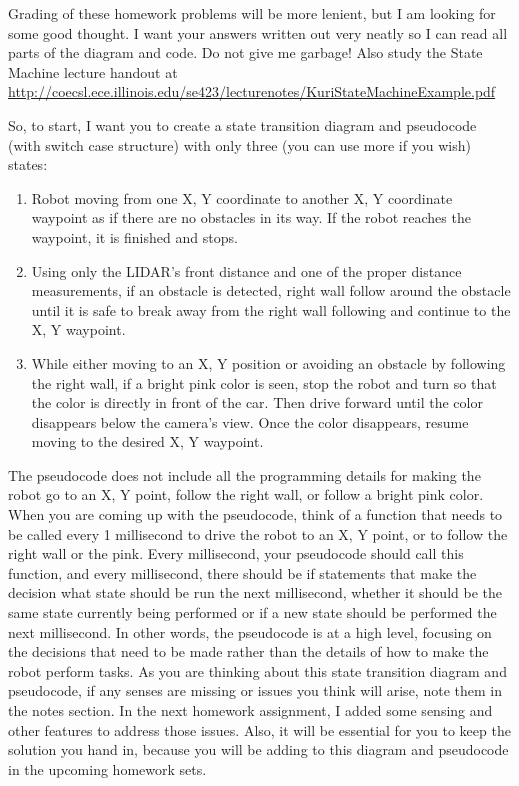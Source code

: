 \documentclass[11pt]{article}
\begin{document}
Grading of these homework problems will be more lenient, but I am looking for some good thought. I want your answers written out very neatly so I can read all parts of the diagram and code. Do not give me garbage! Also study the State Machine lecture handout at \url{http://coecsl.ece.illinois.edu/se423/lecturenotes/KuriStateMachineExample.pdf}

So, to start, I want you to create a state transition diagram and pseudocode (with switch case structure) with only three (you can use more if you wish) states:
\begin{enumerate}
    \item Robot moving from one X, Y coordinate to another X, Y coordinate waypoint as if there are no obstacles in its way. If the robot reaches the waypoint, it is finished and stops.
    \item Using only the LIDAR’s front distance and one of the proper distance measurements, if an obstacle is detected, right wall follow around the obstacle until it is safe to break away from the right wall following and continue to the X, Y waypoint.
    \item While either moving to an X, Y position or avoiding an obstacle by following the right wall, if a bright pink color is seen, stop the robot and turn so that the color is directly in front of the car. Then drive forward until the color disappears below the camera’s view. Once the color disappears, resume moving to the desired X, Y waypoint.
\end{enumerate}
%
The pseudocode does not include all the programming details for making the robot go to an X, Y point, follow the right wall, or follow a bright pink color. When you are coming up with the pseudocode, think of a function that needs to be called every 1 millisecond to drive the robot to an X, Y point, or to follow the right wall or the pink. Every millisecond, your pseudocode should call this function, and every millisecond, there should be if statements that make the decision what state should be run the next millisecond, whether it should be the same state currently being performed or if a new state should be performed the next millisecond. In other words, the pseudocode is at a high level, focusing on the decisions that need to be made rather than the details of how to make the robot perform tasks.
As you are thinking about this state transition diagram and pseudocode, if any senses are missing or issues you think will arise, note them in the notes section. In the next homework assignment, I added some sensing and other features to address those issues. Also, it will be essential for you to keep the solution you hand in, because you will be adding to this diagram and pseudocode in the upcoming homework sets.

\MakeFooter
\end{document}
